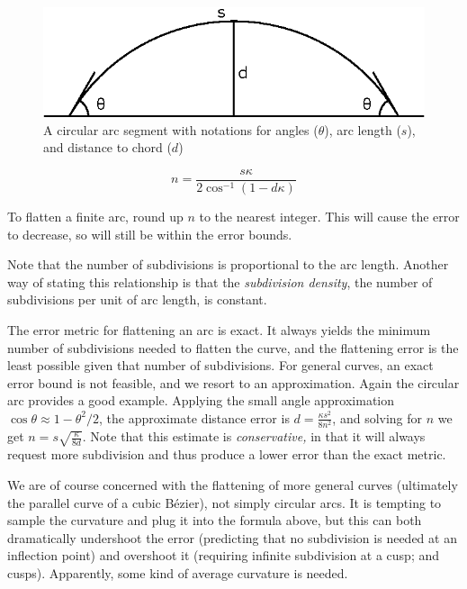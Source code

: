 \documentclass[sigconf, authordraft]{acmart}
\begin{document}
\begin{figure}
    \includegraphics[scale=0.5]{arc_chord}
    \caption{A circular arc segment with notations for angles ($\theta$), arc length ($s$), and distance to chord ($d$)}
    \label{fig:arc_chord}
\end{figure}


\[
n = \frac{s\kappa}{2\cos^{-1}\left( 1- d\kappa \right)}
\]

To flatten a finite arc, round up $n$ to the nearest integer. This will cause the error to decrease, so will still be within the error bounds.

Note that the number of subdivisions is proportional to the arc length. Another way of stating this relationship is that the \emph{subdivision density}, the number of subdivisions per unit of arc length, is constant.

The error metric for flattening an arc is exact. It always yields the minimum number of subdivisions needed to flatten the curve, and the flattening error is the least possible given that number of subdivisions. For general curves, an exact error bound is not feasible, and we resort to an approximation. Again the circular arc provides a good example. Applying the small angle approximation $\cos \theta \approx 1 - \theta^2/2$, the approximate distance error is $d = \frac{\kappa s^2}{8n^2}$, and solving for $n$ we get $n = s\sqrt{\frac{\kappa}{8d}}$. Note that this estimate is \emph{conservative,} in that it will always request more subdivision and thus produce a lower error than the exact metric.

We are of course concerned with the flattening of more general curves (ultimately the parallel curve of a cubic Bézier), not simply circular arcs. It is tempting to sample the curvature and plug it into the formula above, but this can both dramatically undershoot the error (predicting that no subdivision is needed at an inflection point) and overshoot it (requiring infinite subdivision at a cusp; and cusps). Apparently, some kind of average curvature is needed.
\end{document}
